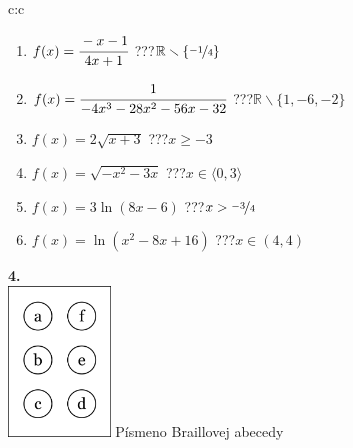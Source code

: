 \documentclass[10pt]{report}
\begin{document}
\begin{tabular}{c:c}
\begin{minipage}[c][104.5mm][t]{0.5\linewidth}
\begin{center}
\begin{minipage}{0.79\linewidth}
\begin{center}
\begin{varwidth}{\linewidth}
\begin{enumerate}
\item $f(x)=\cfrac{-x-1}{4x+1}$\quad \dotfill\; ???\;\dotfill \quad $\mathbb{R}\smallsetminus\{\nicefrac{-1}{4}\}$
\item $f(x)=\cfrac{1}{-4x^3-28x^2-56x-32}$\quad \dotfill\; ???\;\dotfill \quad $\mathbb{R}\smallsetminus\{1,-6,-2\}$
\item $f(x)=2\sqrt{x+3}$\quad \dotfill\; ???\;\dotfill \quad $x\geq-3$
\item $f(x)=\sqrt{-x^2-3x}$\quad \dotfill\; ???\;\dotfill \quad $x\in\langle0 , 3\rangle$
\item $f(x)=3\ln{(8x-6)}$\quad \dotfill\; ???\;\dotfill \quad $x>\nicefrac{-3}{4}$
\item $f(x)=\ln{(x^2-8x+16)}$\quad \dotfill\; ???\;\dotfill \quad $x\in(4 , 4)$
\end{enumerate}
\end{varwidth}
\end{center}
\end{minipage}
\begin{minipage}{0.20\linewidth}
\begin{center}
{\Huge\bfseries 4.} \\[2mm]
\includegraphics[height=40mm]{../images/braille.png}
{\small Písmeno Braillovej abecedy}
\end{center}
\end{minipage}
\end{center}
\end{minipage}
%
\end{tabular}
\newpage
\thispagestyle{empty}
\end{document}
